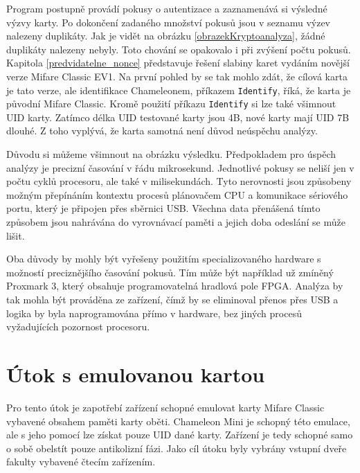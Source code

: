Program postupně provádí pokusy o autentizace a zaznamenává si výsledné výzvy karty. Po dokončení zadaného množství pokusů jsou v seznamu výzev nalezeny duplikáty. Jak je vidět na obrázku \ref{obrazekKryptoanalyza}, žádné duplikáty nalezeny nebyly. Toto chování se opakovalo i při zvýšení počtu pokusů. Kapitola \ref{predvidatelne_nonce} představuje řešení slabiny karet vydáním novější verze Mifare Classic EV1. Na první pohled by se tak mohlo zdát, že cílová karta je tato verze, ale identifikace Chameleonem, příkazem \verb|Identify|, říká, že karta je původní Mifare Classic. Kromě použití příkazu \verb|Identify| si lze také všimnout UID karty. Zatímco délka UID testované karty jsou 4B, nové karty mají UID 7B dlouhé\cite{Mifare_Classic_Official_about}. Z toho vyplývá, že karta samotná není důvod neúspěchu analýzy.\par
Důvodu si můžeme všimnout na obrázku výsledku. Předpokladem pro úspěch analýzy je precizní časování v řádu mikrosekund. Jednotlivé pokusy se neliší jen v počtu cyklů procesoru, ale také v milisekundách. Tyto nerovnosti jsou způsobeny možným přepínáním kontextu procesů plánovačem CPU a komunikace sériového portu, který je připojen přes sběrnici USB. Všechna data přenášená tímto způsobem jsou nahrávána do vyrovnávací paměti a jejich doba odeslání se může lišit\cite{RelayUtokBP}.\par
Oba důvody by mohly být vyřešeny použitím specializovaného hardware s možností preciznějšího časování pokusů. Tím může být například už zmíněný Proxmark 3, který obsahuje programovatelná hradlová pole FPGA\cite{Proxmark}. Analýza by tak mohla být prováděna ze zařízení, čímž by se eliminoval přenos přes USB a logika by byla naprogramována přímo v hardware, bez jiných procesů vyžadujících pozornost procesoru.

\section{Útok s emulovanou kartou}
Pro tento útok je zapotřebí zařízení schopné emulovat karty Mifare Classic vybavené obsahem paměti karty oběti. Chameleon Mini je schopný této emulace, ale s jeho pomocí lze získat pouze UID dané karty. Zařízení je tedy schopné samo o sobě obelstít pouze antikolizní fázi. Jako cíl útoku byly vybrány vstupní dveře fakulty vybavené čtecím zařízením. \par

